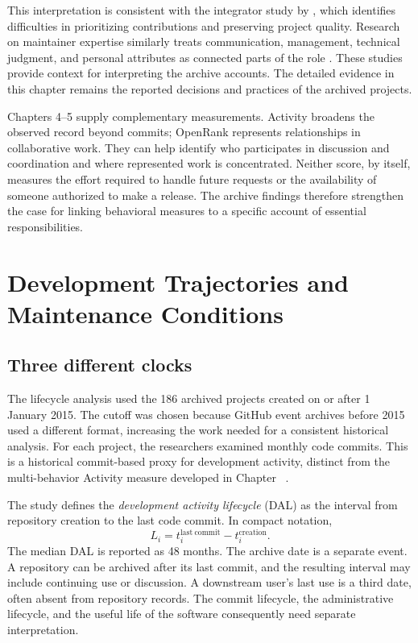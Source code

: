 This interpretation is consistent with the integrator study by \citet{gousios2015}, which identifies difficulties in prioritizing contributions and preserving project quality. Research on maintainer expertise similarly treats communication, management, technical judgment, and personal attributes as connected parts of the role \citep{dias2021}. These studies provide context for interpreting the archive accounts. The detailed evidence in this chapter remains the reported decisions and practices of the archived projects.

Chapters 4--5 supply complementary measurements. Activity broadens the observed record beyond commits; OpenRank represents relationships in collaborative work. They can help identify who participates in discussion and coordination and where represented work is concentrated. Neither score, by itself, measures the effort required to handle future requests or the availability of someone authorized to make a release. The archive findings therefore strengthen the case for linking behavioral measures to a specific account of essential responsibilities.

\section{Development Trajectories and Maintenance Conditions}
\label{sec:ch8-trajectories}

\subsection{Three different clocks}
The lifecycle analysis used the 186 archived projects created on or after 1 January 2015. The cutoff was chosen because GitHub event archives before 2015 used a different format, increasing the work needed for a consistent historical analysis. For each project, the researchers examined monthly code commits. This is a historical commit-based proxy for development activity, distinct from the multi-behavior Activity measure developed in Chapter~ \citep{xia2022}.

The study defines the \emph{development activity lifecycle} (DAL) as the interval from repository creation to the last code commit. In compact notation,
\begin{equation}
L_i=t_i^{\mathrm{last\ commit}}-t_i^{\mathrm{creation}}.
\label{eq:ch8-dal}
\end{equation}
The median DAL is reported as 48 months. The archive date is a separate event. A repository can be archived after its last commit, and the resulting interval may include continuing use or discussion. A downstream user's last use is a third date, often absent from repository records. The commit lifecycle, the administrative lifecycle, and the useful life of the software consequently need separate interpretation.

